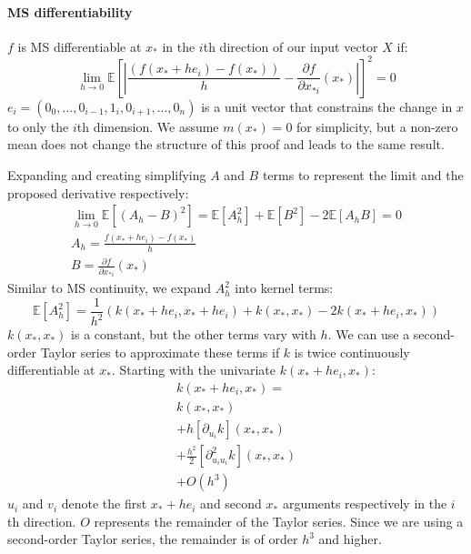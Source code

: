 \paragraph{MS differentiability}
$f$ is MS differentiable at $x_*$ in the $i$th direction of our input vector $X$ if: \cite{gp-ml}
\begin{equation*}
    \lim_{h \to 0} \mathbb{E} \left[| \frac{(f(x_* + h e_i) - f(x_*))}{h} - \frac{\partial f}{\partial x_{*i}}(x_*) |\right]^2 = 0
\end{equation*}
$e_i = (0_0, ..., 0_{i-1}, 1_i, 0_{i+1}, ..., 0_n)$ is a unit vector that constrains the change in $x$ to only the $i$th dimension. We assume $m(x_*) = 0$ for simplicity, but a non-zero mean does not change the structure of this proof and leads to the same result.

Expanding and creating simplifying $A$ and $B$ terms to represent the limit and the proposed derivative respectively:
\begin{equation*}
    \begin{aligned}
        \lim_{h \to 0} \mathbb{E} \left[(A_h - B)^2\right] = \mathbb{E}[A_h^2] + \mathbb{E}[B^2] - 2\mathbb{E}[A_h B] = 0 \\
        A_h = \frac{f(x_* + h e_i) - f(x_*)}{h} \\
        B = \frac{\partial f}{\partial x_{*i}}(x_*)
    \end{aligned}
\end{equation*}
Similar to MS continuity, we expand $A_h^2$ into kernel terms:
\begin{equation} \label{eq:msd_a}
    \mathbb{E}[A_h^2] = \frac{1}{h^2} \left( k(x_* + h e_i, x_* + h e_i) + k(x_*, x_*) - 2k(x_* + h e_i, x_*) \right)
\end{equation}
$k(x_*,x_*)$ is a constant, but the other terms vary with $h$. We can use a second-order Taylor series to approximate these terms if $k$ is twice continuously differentiable at $x_*$. Starting with the univariate $k(x_* + h e_i, x_*)$:
\begin{equation*}
    \begin{aligned}
        k(x_* + h e_i, x_*) = \\
        k(x_*, x_*) \\
        + h [\partial_{u_i}k](x_*, x_*) \\
        + \frac{h^2}{2} [\partial_{u_i u_i}^2k] (x_*, x_*) \\
        + O(h^3)
    \end{aligned}
\end{equation*}
$u_i$ and $v_i$ denote the first $x_* + h e_i$ and second $x_*$ arguments respectively in the $i$th direction. $O$ represents the remainder of the Taylor series. Since we are using a second-order Taylor series, the remainder is of order $h^3$ and higher.

